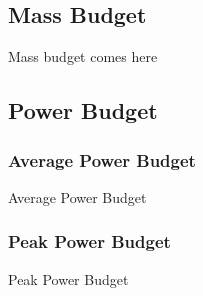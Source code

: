 \subsection{Mass Budget}
\label{sect:massbudget}
Mass budget comes here
\subsection{Power Budget}
\label{sect:powerbudget}
\subsubsection{Average Power Budget}
Average Power Budget

\subsubsection{Peak Power Budget}
Peak Power Budget

